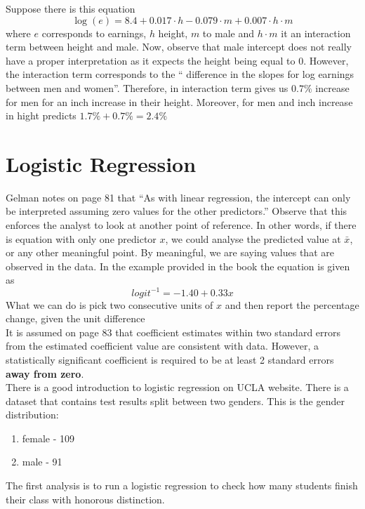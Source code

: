 \documentclass{article}
\begin{document}
Suppose there is this equation
\begin{equation}
\log(e) = 8.4+0.017 \cdot h - 0.079 \cdot m + 0.007 \cdot h \cdot m 
\end{equation}
where $e$ corresponds to earnings, $h$ height, $m$ to male and $h \cdot m $ it an interaction term between height and male. Now, observe that male intercept does not really have a proper interpretation as it expects the height being equal to 0. However, the interaction term corresponds to the `` difference in the slopes for log earnings between men and women''. Therefore, in interaction term gives us $0.7\%$ increase for men for an inch increase in their height. Moreover, for men and inch increase in hight predicts $1.7\% + 0.7\% = 2.4\%$

\section{Logistic Regression}
Gelman notes on page 81 that ``As with linear regression, the intercept can only be interpreted assuming zero values for the other predictors.'' Observe that this enforces the analyst to look at another point of reference. In other words, if there is equation with only one predictor $x$, we could analyse the predicted value at $\bar{x}$, or any other meaningful point. By meaningful, we are saying values that are observed in the data. In the example provided in the book the equation is given as 
\begin{equation}
logit^{-1} = -1.40 + 0.33x
\end{equation}
What we can do is pick two consecutive units of $x$ and then report the percentage change, given the unit difference
\\
\indent
It is assumed on page 83 that coefficient estimates within two standard errors from the estimated coefficient value are consistent with data. However, a statistically significant coefficient is required to be at least 2 standard errors \textbf{away from zero}.
\\
\indent
There is a good introduction to logistic regression on UCLA website. There is a dataset that contains test results split between two genders. This is the gender distribution:
\begin{enumerate}
\item female - 109
\item male - 91
\end{enumerate}
The first analysis is to run a logistic regression to check how many students finish their class with honorous distinction.
\end{document}
